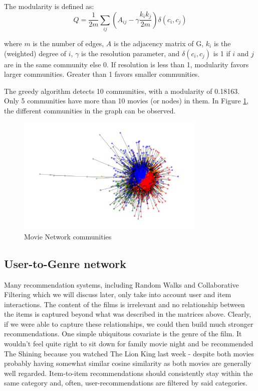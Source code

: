 \documentclass[12pt]{article}
\numberwithin{equation}{section}
\begin{document}
The modularity is defined as: 
\begin{equation}
Q = \frac{1}{2m} \sum_{ij} ( A_{ij} - \gamma \frac{k_i k_j}{2m}) \delta (c_i, c_j)
\end{equation}

where $m$ is the number of edges, $A$ is the adjacency matrix of G, $k_i$ is the (weighted) degree of $i$, $\gamma$ is the resolution parameter, and $\delta (c_i, c_j)$ is 1 if $i$ and $j$ are in the same community else 0. If resolution is less than 1, modularity favors larger communities. Greater than 1 favors smaller communities.

The greedy algorithm detects 10 communities, with a modularity of 0.18163. Only 5 communities have more than 10 movies (or nodes) in them. In Figure \ref{fig:comm_detection}, the different communities in the graph can be observed.

\begin{figure}[h!]
    \centering
  	\includegraphics[width=0.8\textwidth]{community_detection.png}
  	\caption{Movie Network communities}
  	\label{fig:comm_detection}
\end{figure}

\newpage

\subsection{User-to-Genre network}

Many recommendation systems, including Random Walks and Collaborative Filtering which we will discuss later, only take into account user and item interactions. The content of the films is irrelevant and no relationship between the items is captured beyond what was described in the matrices above. Clearly, if we were able to capture these relationships, we could then build much stronger recommendations. One simple ubiquitous covariate is the genre of the film. It wouldn't feel quite right to sit down for family movie night and be recommended The Shining because you watched The Lion King last week - despite both movies probably having somewhat similar cosine similarity as both movies are generally well regarded. Item-to-item recommendations should consistently stay within the same category and, often, user-recommendations are filtered by said categories.
\end{document}
